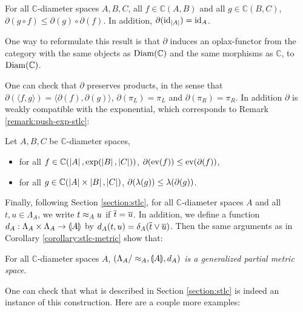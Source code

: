 \begin{proposition} For all $\mathbb{C}$-diameter spaces $A, B, C$, all $f \in \mathbb{C}(A, B)$ and all $g \in \mathbb{C}(B, C)$, $\partial(g \circ f) \leq \partial(g) \circ \partial(f)$. In addition, $\partial(\operatorname{id}_{\left\vert A\right\vert}) = \operatorname{id}_A$.
\end{proposition}
 
One way to reformulate this result is that $\partial$ induces an oplax-functor from the category with the same objects as $\operatorname{Diam}(\mathbb{C})$ and the same morphisms as $\mathbb{C}$, to $\operatorname{Diam}(\mathbb{C})$.

One can check that $\partial$ preserves products, in the sense that $\partial (\langle f, g \rangle) = \langle\partial(f), \partial(g)\rangle$, $\partial(\pi_L) = \pi_L$ and $\partial(\pi_R) = \pi_R$. In addition $\partial$ is weakly compatible with the exponential, which corresponds to Remark \ref{remark:push-exp-stlc}:

\begin{proposition} Let $A, B, C$ be $\mathbb{C}$-diameter spaces, \begin{itemize}
\item for all $f \in \mathbb{C}(\left\vert A\right\vert, \exp(\left\vert B\right\vert, \left\vert C\right\vert))$, $\partial(\operatorname{ev}(f)) \leq \operatorname{ev}(\partial(f))$,
\item for all $g \in \mathbb{C}(\left\vert A\right\vert\times\left\vert B\right\vert, \left\vert C\right\vert)$, $\partial(\lambda(g)) \leq \lambda(\partial(g))$.
\end{itemize}
\end{proposition}

Finally, following Section \ref{section:stlc}, for all $\mathbb{C}$-diameter spaces $A$ and all  $t,u \in \Lambda_A$, we write $t \approx_A u$ if $\overline{t} = \overline{u}$. In addition, we define a function $d_A : \Lambda_A \times \Lambda_A \to \llparenthesis A \rrparenthesis$ by $d_A(t,u) = \delta_A(\overline{t} \vee \overline{u})$. Then the same arguments as in Corollary \ref{corollary:stlc-metric} show that:

\begin{proposition} For all $\mathbb{C}$-diameter spaces $A$, \emph{$(\Lambda_{A}/\approx_{A}, \llparenthesis A \rrparenthesis, d_{A})$ is a generalized partial metric space}.
\end{proposition}

One can check that what is described in Section \ref{section:stlc} is indeed an instance of this construction. Here are a couple more examples:

